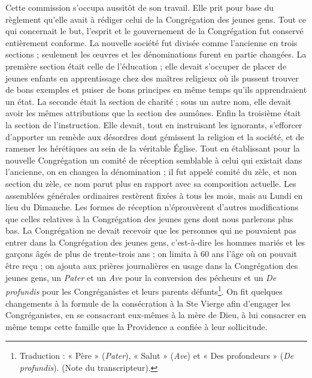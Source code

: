 Cette commission s'occupa aussitôt de son travail. Elle prit pour base du règlement qu'elle avait à rédiger celui
de la Congrégation des jeunes gens. Tout ce qui concernait le but, l'esprit et le gouvernement de la Congrégation fut conservé entièrement conforme. La nouvelle société fut divisée comme l'ancienne en trois sections ; seulement les œuvres et les dénominations furent en partie changées. La première section était celle de l'éducation ; elle devait s'occuper de placer de jeunes enfants en apprentissage chez des maîtres religieux où ils pussent trouver de bons exemples et puiser de bons principes en même temps qu'ils apprendraient un état. La seconde était la section de charité ; sous un autre nom, elle devait avoir les mêmes attributions que la section des aumônes. Enfin la troisième était la section de l'instruction. Elle devait, tout en instruisant les ignorants, s'efforcer d'apporter un remède aux désordres dont gémissent la religion et la société, et de ramener les hérétiques au sein de la véritable Église. Tout en établissant pour la nouvelle Congrégation un comité de réception semblable à celui qui existait dans l'ancienne, on en changea la dénomination ; il fut appelé comité du zèle, et non section du zèle, ce nom parut plus en rapport avec sa composition actuelle. Les assemblées générales ordinaires restèrent fixées à tous les mois, mais au Lundi en lieu du Dimanche. Les formes de réception n'éprouvèrent d'autres modifications que celles relatives à la Congrégation des jeunes gens dont nous parlerons plus bas. La Congrégation ne devait recevoir que les personnes qui ne pouvaient pas entrer dans la Congrégation des jeunes gens, c'est-à-dire les hommes mariés et les garçons âgés de plus de trente-trois ans ; on limita à 60 ans l'âge où on pouvait
être reçu ; on ajouta aux prières journalières en usage dans la Congrégation des jeunes gens, un \textit{Pater} et un \textit{Ave} pour la conversion des pécheurs et un \textit{De profundis} pour les Congréganistes et leurs parents défunts\footnote{Traduction : « Père » (\textit{Pater}), « Salut » (\textit{Ave}) et « Des profondeurs » (\textit{De profundis}). (Note du transcripteur).}. On fit quelques changements à la formule de la consécration à la Ste Vierge afin d'engager les Congréganistes, en se consacrant eux-mêmes à la mère de Dieu, à lui consacrer en même temps cette famille que la Providence a confiée à leur sollicitude.

